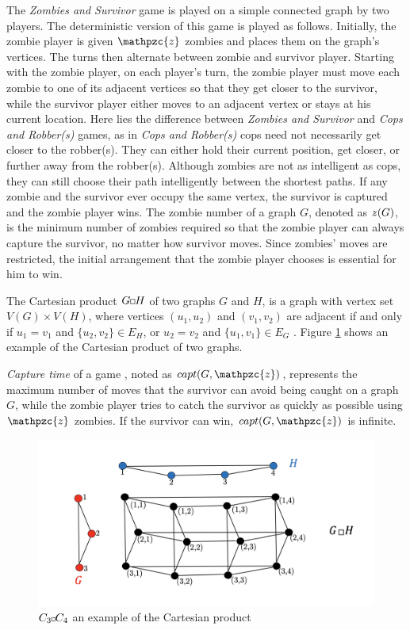 \documentclass[1p]{elsarticle}
\newcommand{\zn}{\ooalign{$z$\cr\hfil\rule[.5ex]{.2em}{.08ex}\hfil\cr}}
\newcommand{\sq}[1][black]{%
\begin{tikzpicture}                                                           
  \draw[#1] (2pt,0pt) -- (6pt,0pt);   
  \draw[#1] (2pt,0pt) -- (2pt,4pt);    
  \draw[#1] (2pt,4pt) -- (6pt,4pt);   
  \draw[#1] (6pt,0pt) -- (6pt,4pt);
\end{tikzpicture}%
}
\newcommand{\sqSmall}[1][black]{%
\begin{tikzpicture}                                                           
  \draw[#1] (1.5pt,0pt) -- (4.5pt,0pt);   
  \draw[#1] (1.5pt,0pt) -- (1.5pt,3pt);    
  \draw[#1] (1.5pt,3pt) -- (4.5pt,3pt);   
  \draw[#1] (4.5pt,0pt) -- (4.5pt,3pt);
\end{tikzpicture}%
}
\begin{document}
The {\it Zombies and Survivor} game is played on a simple connected graph by two players. The deterministic version of
this game \cite{Fitz16} is played as follows. Initially, the zombie player is given $\mathpzc{z}$ zombies and places
them on the graph's vertices. The turns then alternate between zombie and survivor player. Starting with the zombie
player, on each player's turn, the zombie player must move each zombie to one of its adjacent vertices so that they get
closer to the survivor, while the survivor player either moves to an adjacent vertex or stays at his current location.
Here lies the difference between {\it Zombies and Survivor} and {\it Cops and Robber(s)} games, as in {\it Cops and
Robber(s)} cops need not necessarily get closer to the robber(s). They can either hold their current position, get
closer, or further away from the robber(s). Although zombies are not as intelligent as cops, they can still choose their
path intelligently between the shortest paths. If any zombie and the survivor ever occupy the same vertex, the survivor
is captured and the zombie player wins. The zombie number of a graph $G$, denoted as $\zn(G)$, is the minimum number of
zombies required so that the zombie player can always capture the survivor, no matter how survivor moves. Since zombies'
moves are restricted, the initial arrangement that the zombie player chooses is essential for him to win.

The Cartesian product $G \sq H$ of two graphs $G$ and $H$, is a graph with vertex set $V(G) \times V(H)$, where
vertices $(u_1 , u_2)$ and $(v_1 , v_2)$ are adjacent if and only if $u_1 = v_1$ and $ \{ u_2 , v_2 \} \in E_{H} $, or
$u_2 = v_2$ and $ \{u_1 , v_1 \} \in E_{G}$ \cite{West02}. Figure \ref{fig:p2} shows an example of the Cartesian product
of two graphs.

{\it Capture time} of a game \cite{Bonato09}, noted as $capt(G,\mathpzc{z})$, represents the maximum number of moves
that the survivor can avoid being caught on a graph $G$, while the zombie player tries to catch the survivor as quickly
as possible using $\mathpzc{z}$ zombies. If the survivor can win, $capt(G,\mathpzc{z})$ is infinite.

\begin{figure}[h!]
	\centering
	\includegraphics[width=0.9\linewidth]{CpWest.png}
	\caption{$C_3 \sqSmall C_4$ an example of the Cartesian product}
	\label{fig:p2}
\end{figure}
\end{document}
